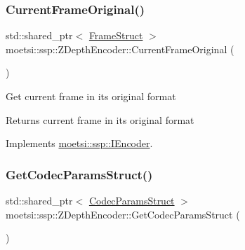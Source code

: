 \mbox{\label{classmoetsi_1_1ssp_1_1ZDepthEncoder_abe5820ee0dea5fec22e398a7ba4d6777}} 
\subsubsection{\texorpdfstring{Current\+Frame\+Original()}{CurrentFrameOriginal()}}
{\footnotesize\ttfamily std\+::shared\+\_\+ptr$<$ \hyperlink{structmoetsi_1_1ssp_1_1FrameStruct}{Frame\+Struct} $>$ moetsi\+::ssp\+::\+Z\+Depth\+Encoder\+::\+Current\+Frame\+Original (\begin{DoxyParamCaption}{ }\end{DoxyParamCaption})\hspace{0.3cm}{\ttfamily [virtual]}}

Get current frame in its original format \begin{DoxyReturn}{Returns}
current frame in its original format 
\end{DoxyReturn}


Implements \hyperlink{classmoetsi_1_1ssp_1_1IEncoder_ab60bdaae0a85289dfa31a12bab533dc0}{moetsi\+::ssp\+::\+I\+Encoder}.

\mbox{\label{classmoetsi_1_1ssp_1_1ZDepthEncoder_a3fc9f84387dba09d1deb4761031b598f}} 
\subsubsection{\texorpdfstring{Get\+Codec\+Params\+Struct()}{GetCodecParamsStruct()}}
{\footnotesize\ttfamily std\+::shared\+\_\+ptr$<$ \hyperlink{structmoetsi_1_1ssp_1_1CodecParamsStruct}{Codec\+Params\+Struct} $>$ moetsi\+::ssp\+::\+Z\+Depth\+Encoder\+::\+Get\+Codec\+Params\+Struct (\begin{DoxyParamCaption}{ }\end{DoxyParamCaption})\hspace{0.3cm}{\ttfamily [virtual]}}

